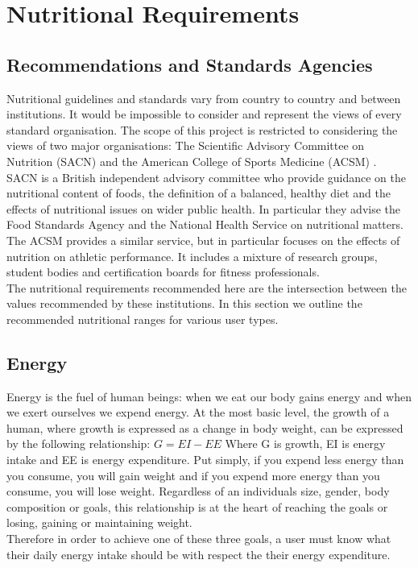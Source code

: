 \usepackage{mathtools}

\section{Nutritional Requirements}
\subsection{Recommendations and Standards Agencies}
Nutritional guidelines and standards vary from country to country and between institutions. It would be impossible to consider and represent the views of every standard organisation. The scope of this project is restricted to considering the views of two major organisations: The Scientific Advisory Committee on Nutrition (SACN) \cite{SACNHome} and the American College of Sports Medicine (ACSM) \cite{ACSMHome}. \\

SACN is a British independent advisory committee who provide guidance on the nutritional content of foods, the definition of a balanced, healthy diet and the effects of nutritional issues on wider public health. In particular they advise the Food Standards Agency and the National Health Service on nutritional matters.\\

The ACSM provides a similar service, but in particular focuses on the effects of nutrition on athletic performance. It includes a mixture of research groups, student bodies and certification boards for fitness professionals.\\

The nutritional requirements recommended here are the intersection between the values recommended by these institutions. In this section we outline the recommended nutritional ranges for various user types. 
\subsection{Energy}
Energy is the fuel of human beings: when we eat our body gains energy and when we exert ourselves we expend energy. At the most basic level, the growth of a human, where growth is expressed as a change in body weight, can be expressed by the following relationship:
$G = EI - EE$
Where G is growth, EI is energy intake and EE is energy expenditure. Put simply, if you expend less energy than you consume, you will gain weight and if you expend more energy than you consume, you will lose weight. Regardless of an individuals size, gender, body composition or goals, this relationship is at the heart of reaching the goals or losing, gaining or maintaining weight.\\
Therefore in order to achieve one of these three goals, a user must know what their daily energy intake should be with respect the their energy expenditure.\\

